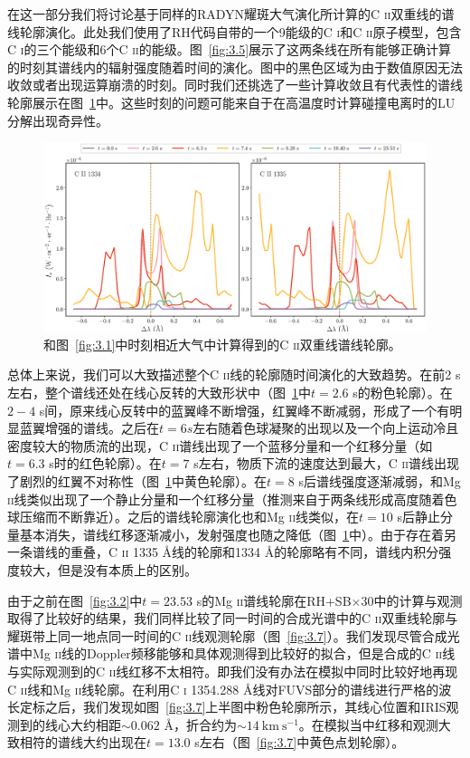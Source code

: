 在这一部分我们将讨论基于同样的RADYN耀斑大气演化所计算的C \textsc{ii}双重线的谱线轮廓演化。此处我们使用了RH代码自带的一个9能级的C \textsc{i}和C \textsc{ii}原子模型，包含C \textsc{i}的三个能级和6个C \textsc{ii}的能级。图~\ref{fig:3.5}展示了这两条线在所有能够正确计算的时刻其谱线内的辐射强度随着时间的演化。图中的黑色区域为由于数值原因无法收敛或者出现运算崩溃的时刻。同时我们还挑选了一些计算收敛且有代表性的谱线轮廓展示在图~\ref{fig:3.6}中。这些时刻的问题可能来自于在高温度时计算碰撞电离时的LU分解出现奇异性。
\begin{figure}
	\centering
	\includegraphics[width=\textwidth]{figs/5F11_spectra_line_C}
	\caption{和图~\ref{fig:3.1}中时刻相近大气中计算得到的C \textsc{ii}双重线谱线轮廓。}
	\label{fig:3.6}
\end{figure}


总体上来说，我们可以大致描述整个C \textsc{ii}线的轮廓随时间演化的大致趋势。在前2 s左右，整个谱线还处在线心反转的大致形状中（图~\ref{fig:3.6}中$t=2.6$ s的粉色轮廓）。在$2-4$ s间，原来线心反转中的蓝翼峰不断增强，红翼峰不断减弱，形成了一个有明显蓝翼增强的谱线。之后在$t=6 s$左右随着色球凝聚的出现以及一个向上运动冷且密度较大的物质流的出现，C \textsc{ii}谱线出现了一个蓝移分量和一个红移分量（如$t=6.3$ s时的红色轮廓）。在$t=7$ s左右，物质下流的速度达到最大，C \textsc{ii}谱线出现了剧烈的红翼不对称性（图~\ref{fig:3.6}中黄色轮廓）。在$t=8$ s后谱线强度逐渐减弱，和Mg \textsc{ii}线类似出现了一个静止分量和一个红移分量（推测来自于两条线形成高度随着色球压缩而不断靠近）。之后的谱线轮廓演化也和Mg \textsc{ii}线类似，在$t=10$ s后静止分量基本消失，谱线红移逐渐减小，发射强度也随之降低（图~\ref{fig:3.6}中）。由于存在着另一条谱线的重叠，C \textsc{ii} 1335 \mbox{\AA}线的轮廓和1334 \mbox{\AA}的轮廓略有不同，谱线内积分强度较大，但是没有本质上的区别。

由于之前在图~\ref{fig:3.2}中$t=23.53$ s的Mg \textsc{ii}谱线轮廓在RH+SB$\times30$中的计算与观测取得了比较好的结果，我们同样比较了同一时间的合成光谱中的C \textsc{ii}双重线轮廓与耀斑带上同一地点同一时间的C \textsc{ii}线观测轮廓（图~\ref{fig:3.7}）。我们发现尽管合成光谱中Mg \textsc{ii}线的Doppler频移能够和具体观测得到比较好的拟合，但是合成的C \textsc{ii}线与实际观测到的C \textsc{ii}线红移不太相符。即我们没有办法在模拟中同时比较好地再现C \textsc{ii}线和Mg \textsc{ii}线轮廓。在利用C \textsc{i} 1354.288 \mbox{\AA}线对FUVS部分的谱线进行严格的波长定标之后，我们发现如图~\ref{fig:3.7}上半图中粉色轮廓所示，其线心位置和IRIS观测到的线心大约相距$\sim 0.062$ \mbox{\AA}，折合约为$\sim 14\ \mathrm{km\  s^{-1}}$。在模拟当中红移和观测大致相符的谱线大约出现在$t=13.0$ s左右（图~\ref{fig:3.7}中黄色点划轮廓）。

